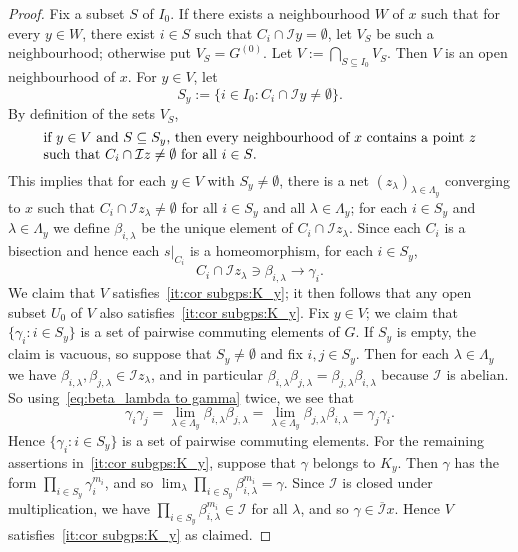 \documentclass[a4paper, 12pt]{amsart}
\theoremstyle{plain}
\theoremstyle{definition}
\theoremstyle{remark}
\newcommand{\Ii}{\mathcal{I}}
\newcommand{\Iicl}{\overline{\mathcal{I}}}
\numberwithin{equation}{section}
\begin{document}
\begin{proof}
Fix a subset $S$ of $I_0$. If there exists a neighbourhood $W$ of $x$ such
that for every $y \in W$, there exist $i \in S$ such that $C_i \cap \Ii y =
\emptyset$, let $V_S$ be such a neighbourhood; otherwise put $V_S = G^{(0)}$.
Let $V := \bigcap_{S \subseteq I_0} V_S$. Then $V$ is an open neighbourhood
of $x$. For $y\in V$, let
\[
    S_y := \{i \in I_0: C_i \cap \Ii y \not= \emptyset\}.
\]
By definition of the sets $V_S$,
\begin{equation}\label{eq:Toke is clever}
\parbox{0.9\textwidth}{if $y \in V$ and $S\subseteq S_y$, then every neighbourhood
of $x$ contains a point $z$ such that $C_i \cap \Ii z\not= \emptyset$ for
all $i \in S$.}
\end{equation}
This implies that for each $y \in V$ with $S_y\neq\emptyset$, there is a net
$(z_\lambda)_{\lambda \in \Lambda_y}$ converging to $x$ such that $C_i \cap
\Ii z_\lambda \not= \emptyset$ for all $i \in S_y$ and all $\lambda \in
\Lambda_y$; for each $i \in S_y$ and $\lambda \in \Lambda_y$ we define
$\beta_{i,\lambda}$ be the unique element of $C_i \cap \Ii z_\lambda$. Since
each $C_i$ is a bisection and hence each $s|_{C_i}$ is a homeomorphism, for each $i \in S_y$,
\begin{equation}\label{eq:beta_lambda to gamma}
C_i
\cap \Ii z_\lambda \ni \beta_{i,\lambda} \to \gamma_i.
\end{equation}
We claim that $V$ satisfies~\ref{it:cor subgps:K_y}; it then follows that any
open subset $U_0$ of $V$ also satisfies~\ref{it:cor subgps:K_y}. Fix $y \in
V$; we claim that $\{\gamma_i : i\in S_y\}$ is a set of pairwise commuting
elements of $G$. If $S_y$ is empty, the claim is vacuous, so suppose that
$S_y\neq\emptyset$ and fix $i,j \in S_y$. Then for each $\lambda \in
\Lambda_y$ we have $\beta_{i, \lambda}, \beta_{j,\lambda} \in \Ii z_\lambda$,
and in particular $\beta_{i, \lambda} \beta_{j,\lambda} = \beta_{j, \lambda}
\beta_{i,\lambda}$ because $\Ii$ is abelian. So using~\eqref{eq:beta_lambda
to gamma} twice, we see that
\[
\gamma_i \gamma_j
    = \lim_{\lambda \in \Lambda_y} \beta_{i,\lambda}\beta_{j,\lambda}
    = \lim_{\lambda \in \Lambda_y} \beta_{j,\lambda}\beta_{i,\lambda} = \gamma_j\gamma_i.
\]
Hence $\{\gamma_i : i\in S_y \}$ is a set of pairwise commuting elements. For
the remaining assertions in~\ref{it:cor subgps:K_y}, suppose that $\gamma$
belongs to $K_y$. Then $\gamma$ has the form $\prod_{i \in S_y}
\gamma_i^{m_i}$, and so $\lim_\lambda\prod_{i \in S_y}
\beta_{i,\lambda}^{m_i} =\gamma$. Since $\Ii$ is closed under multiplication,
we have $\prod_{i \in S_y} \beta_{i,\lambda}^{m_i} \in \Ii$ for all
$\lambda$, and so $\gamma \in \Iicl x$. Hence $V$ satisfies~\ref{it:cor
subgps:K_y} as claimed.


\end{proof}
\end{document}
